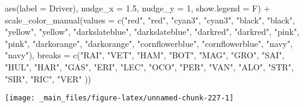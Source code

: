 \documentclass[
]{book}
\newenvironment{Shaded}{\begin{snugshade}}{\end{snugshade}}
\newcommand{\AttributeTok}[1]{\textcolor[rgb]{0.77,0.63,0.00}{#1}}
\newcommand{\DecValTok}[1]{\textcolor[rgb]{0.00,0.00,0.81}{#1}}
\newcommand{\FloatTok}[1]{\textcolor[rgb]{0.00,0.00,0.81}{#1}}
\newcommand{\FunctionTok}[1]{\textcolor[rgb]{0.00,0.00,0.00}{#1}}
\newcommand{\NormalTok}[1]{#1}
\newcommand{\SpecialCharTok}[1]{\textcolor[rgb]{0.00,0.00,0.00}{#1}}
\newcommand{\StringTok}[1]{\textcolor[rgb]{0.31,0.60,0.02}{#1}}
\begin{document}
\begin{Shaded}
\begin{Highlighting}[]
            \FunctionTok{aes}\NormalTok{(}\AttributeTok{label =}\NormalTok{ Driver),}
            \AttributeTok{nudge\_x =} \FloatTok{1.5}\NormalTok{, }\AttributeTok{nudge\_y =} \DecValTok{1}\NormalTok{, }\AttributeTok{show.legend =}\NormalTok{ F) }\SpecialCharTok{+} 
  \FunctionTok{scale\_color\_manual}\NormalTok{(}\AttributeTok{values =} \FunctionTok{c}\NormalTok{(}\StringTok{"red"}\NormalTok{, }\StringTok{"red"}\NormalTok{, }
                                \StringTok{"cyan3"}\NormalTok{, }\StringTok{"cyan3"}\NormalTok{, }
                                \StringTok{"black"}\NormalTok{, }\StringTok{"black"}\NormalTok{, }
                                \StringTok{"yellow"}\NormalTok{, }\StringTok{"yellow"}\NormalTok{,}
                                \StringTok{"darkslateblue"}\NormalTok{, }\StringTok{"darkslateblue"}\NormalTok{,}
                                \StringTok{"darkred"}\NormalTok{, }\StringTok{"darkred"}\NormalTok{, }
                                \StringTok{"pink"}\NormalTok{, }\StringTok{"pink"}\NormalTok{,}
                                \StringTok{"darkorange"}\NormalTok{, }\StringTok{"darkorange"}\NormalTok{,}
                                \StringTok{"cornflowerblue"}\NormalTok{, }\StringTok{"cornflowerblue"}\NormalTok{,}
                                \StringTok{"navy"}\NormalTok{, }\StringTok{"navy"}\NormalTok{),}
                     \AttributeTok{breaks =} \FunctionTok{c}\NormalTok{(}\StringTok{"RAI"}\NormalTok{, }\StringTok{"VET"}\NormalTok{,}
                                \StringTok{"HAM"}\NormalTok{, }\StringTok{"BOT"}\NormalTok{,}
                                \StringTok{"MAG"}\NormalTok{, }\StringTok{"GRO"}\NormalTok{,}
                                \StringTok{"SAI"}\NormalTok{, }\StringTok{"HUL"}\NormalTok{,}
                                \StringTok{"HAR"}\NormalTok{, }\StringTok{"GAS"}\NormalTok{,}
                                \StringTok{"ERI"}\NormalTok{, }\StringTok{"LEC"}\NormalTok{,}
                                \StringTok{"OCO"}\NormalTok{, }\StringTok{"PER"}\NormalTok{,  }
                                \StringTok{"VAN"}\NormalTok{, }\StringTok{"ALO"}\NormalTok{,}
                                \StringTok{"STR"}\NormalTok{, }\StringTok{"SIR"}\NormalTok{,}
                                \StringTok{"RIC"}\NormalTok{, }\StringTok{"VER"}
\NormalTok{                                )) }
\end{Highlighting}
\end{Shaded}

\begin{center}\texttt{[image: \_main\_files/figure-latex/unnamed-chunk-227-1]} \end{center}
\end{document}
